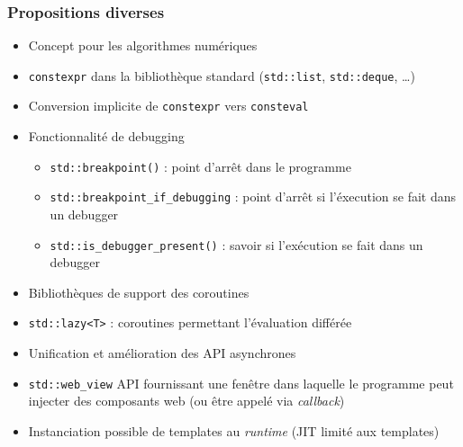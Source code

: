 \documentclass[C++.tex]{subfiles}
\begin{document}
\begin{frame}[fragile]
	\frametitle{Propositions diverses}
	\begin{itemize}
		\item Concept pour les algorithmes numériques
		\item \lstinline|constexpr| dans la bibliothèque standard (\lstinline|std::list|, \lstinline|std::deque|, \ldots)


		\item \og{}Conversion\fg{} implicite de \lstinline|constexpr| vers \lstinline|consteval|
		\item Fonctionnalité de debugging
		\begin{itemize}
			\item \lstinline|std::breakpoint()| : point d'arrêt dans le programme
			\item \lstinline|std::breakpoint_if_debugging| : point d'arrêt si l'éxecution se fait dans un debugger
			\item \lstinline|std::is_debugger_present()| : savoir si l'exécution se fait dans un debugger
		\end{itemize}
		\item Bibliothèques de support des coroutines
		\item \lstinline|std::lazy<T>| : coroutines permettant l'évaluation différée
		\item Unification et amélioration des API asynchrones


		\item \lstinline|std::web_view| API fournissant une fenêtre dans laquelle le programme peut injecter des composants web (ou être appelé via \textit{callback})
		\item Instanciation possible de templates au \textit{runtime} (JIT limité aux templates)

	\end{itemize}
\end{frame}
\end{document}

